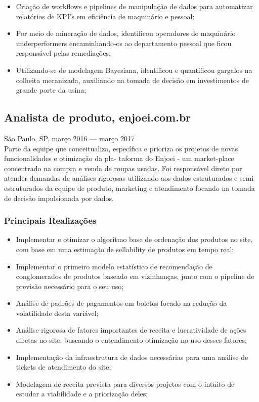 \documentclass{article}
\newcommand{\jobdate}[3]{
\large
\vspace{0.05em} 
  {#1, #2 --- #3}
\vspace{0.5em} 
\\
}
\begin{document}
\begin{itemize}

\item{Criação de workflows e pipelines de manipulação de dados para automatizar relatórios de KPI’s em eficiência de maquinário e pessoal;}
\item{Por meio de mineração de dados, identificou operadores de maquinário underperformers encaminhando-os ao departamento pessoal que ficou responsável pelas remediações;}
\item{Utilizando-se de modelagem Bayesiana, identificou e quantificou gargalos na colheita mecanizada, auxiliando na tomada de decisão em investimentos de grande porte da usina;}

\end{itemize}

\subsection{Analista de produto, enjoei.com.br}
\jobdate{São Paulo, SP}{março 2016}{março 2017}
Parte da equipe que conceitualiza, específica e prioriza os projetos de novas funcionalidades e otimização da pla- taforma do Enjoei - um market-place concentrado na compra e venda de roupas usadas. Foi responsável direto por atender demandas de análises rigorosas utilizando aos dados estruturados e semi estruturados da equipe de produto, marketing e atendimento focando na tomada de decisão impulsionada por dados.
\subsubsection{Principais Realizações}

\begin{itemize}

\item{Implementar e otimizar o algoritmo base de ordenação dos produtos no site, com base em uma estimação de sellability de produtos em tempo real;}
\item{Implementar o primeiro modelo estatístico de recomendação de conglomerados de produtos baseado em vizinhanças, junto com o pipeline de previsão necessário para o seu uso;}
\item{Análise de padrões de pagamentos em boletos focado na redução da volatilidade desta variável;}
\item{Análise rigorosa de fatores importantes de receita e lucratividade de ações diretas no site, buscando o entendimento otimização no uso desses fatores;}
\item{Implementação da infraestrutura de dados necessárias para uma análise de tickets de atendimento do site;}
\item{Modelagem de receita prevista para diversos projetos com o intuito de estudar a viabilidade e a priorização deles;}

\end{itemize}
\end{document}
